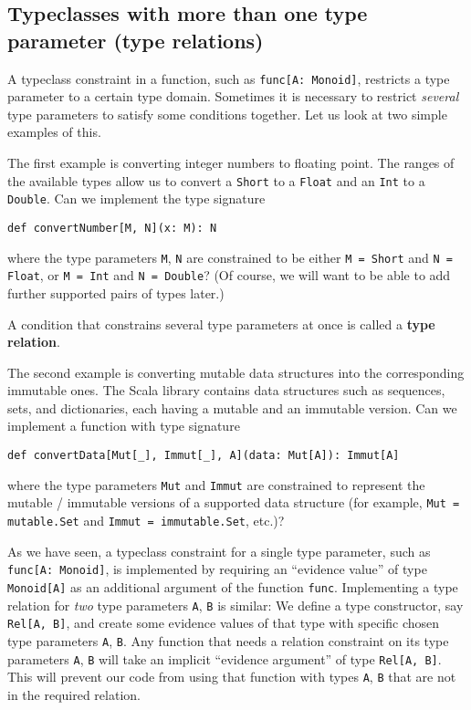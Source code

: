 \subsection{Typeclasses with more than one type parameter (type relations)}

A typeclass constraint in a function, such as \lstinline!func[A: Monoid]!,
restricts a type parameter to a certain type domain. Sometimes it
is necessary to restrict \emph{several} type parameters to satisfy
some conditions together. Let us look at two simple examples of this. 

The first example is converting integer numbers to floating point.
The ranges of the available types allow us to convert a \lstinline!Short!
to a \lstinline!Float! and an \lstinline!Int! to a \lstinline!Double!.
Can we implement the type signature 
\begin{lstlisting}
def convertNumber[M, N](x: M): N
\end{lstlisting}
where the type parameters \lstinline!M!, \lstinline!N! are constrained
to be either \lstinline!M = Short! and \lstinline!N = Float!, or
\lstinline!M = Int! and \lstinline!N = Double!? (Of course, we will
want to be able to add further supported pairs of types later.)

A condition that constrains several type parameters at once is called
a \textbf{type relation}. 

The second example is converting mutable data structures into the
corresponding immutable ones. The Scala library contains data structures
such as sequences, sets, and dictionaries, each having a mutable and
an immutable version. Can we implement a function with type signature
\begin{lstlisting}
def convertData[Mut[_], Immut[_], A](data: Mut[A]): Immut[A]
\end{lstlisting}
where the type parameters \lstinline!Mut! and \lstinline!Immut!
are constrained to represent the mutable / immutable versions of a
supported data structure (for example, \lstinline!Mut = mutable.Set!
and \lstinline!Immut = immutable.Set!, etc.)?

As we have seen, a typeclass constraint for a single type parameter,
such as \lstinline!func[A: Monoid]!, is implemented by requiring
an ``evidence value''
of type \lstinline!Monoid[A]! as an additional argument of the function
\lstinline!func!. Implementing a type relation for \emph{two} type
parameters \lstinline!A!, \lstinline!B! is similar: We define a
type constructor, say \lstinline!Rel[A, B]!, and create some evidence
values of that type with specific chosen type parameters \lstinline!A!,
\lstinline!B!. Any function that needs a relation constraint on its
type parameters \lstinline!A!, \lstinline!B! will take an implicit
``evidence argument'' of type \lstinline!Rel[A, B]!. This will
prevent our code from using that function with types \lstinline!A!,
\lstinline!B! that are not in the required relation.

